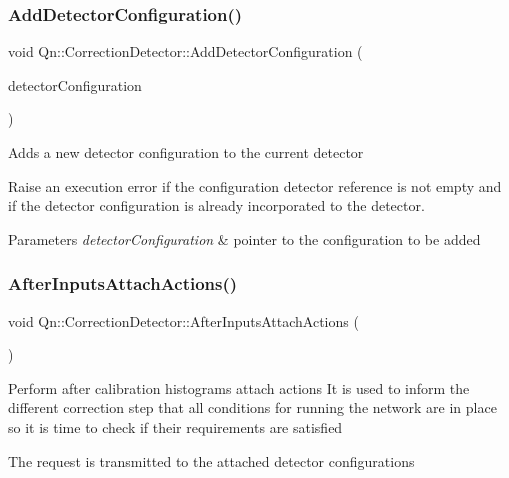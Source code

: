 \subsubsection{\texorpdfstring{Add\+Detector\+Configuration()}{AddDetectorConfiguration()}}
{\footnotesize\ttfamily void Qn\+::\+Correction\+Detector\+::\+Add\+Detector\+Configuration (\begin{DoxyParamCaption}\item[{\mbox{\hyperlink{classQn_1_1DetectorConfiguration}{Detector\+Configuration}} $\ast$}]{detector\+Configuration }\end{DoxyParamCaption})}

Adds a new detector configuration to the current detector

Raise an execution error if the configuration detector reference is not empty and if the detector configuration is already incorporated to the detector. 
\begin{DoxyParams}{Parameters}
{\em detector\+Configuration} & pointer to the configuration to be added \\
\hline
\end{DoxyParams}
\mbox{\label{classQn_1_1CorrectionDetector_a9cd7dd2c1a6d5d8cb7a1a0a18f3f5ee3}} 
\subsubsection{\texorpdfstring{After\+Inputs\+Attach\+Actions()}{AfterInputsAttachActions()}}
{\footnotesize\ttfamily void Qn\+::\+Correction\+Detector\+::\+After\+Inputs\+Attach\+Actions (\begin{DoxyParamCaption}{ }\end{DoxyParamCaption})\hspace{0.3cm}{\ttfamily [virtual]}}

Perform after calibration histograms attach actions It is used to inform the different correction step that all conditions for running the network are in place so it is time to check if their requirements are satisfied

The request is transmitted to the attached detector configurations \mbox{\label{classQn_1_1CorrectionDetector_a9348902c90054c1f1d262081c2818b2e}} 
